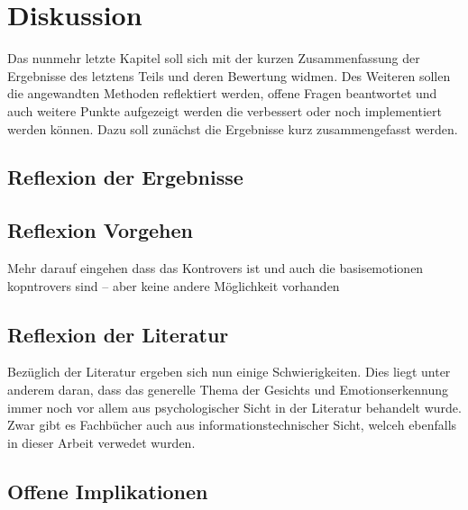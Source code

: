 \documentclass[12pt, a4paper]{scrbook}
\begin{document}
\let\cleardoublepage\relax
\chapter{Diskussion}
Das nunmehr letzte Kapitel soll sich mit der kurzen Zusammenfassung der Ergebnisse des letztens Teils und deren Bewertung widmen. Des Weiteren sollen die angewandten Methoden reflektiert werden, offene Fragen beantwortet und auch weitere Punkte aufgezeigt werden die verbessert oder noch implementiert werden können. Dazu soll zunächst die Ergebnisse kurz zusammengefasst werden.
\section{Reflexion der Ergebnisse}
\section{Reflexion Vorgehen}
Mehr darauf eingehen dass das Kontrovers ist und auch die basisemotionen kopntrovers sind --  aber keine andere Möglichkeit vorhanden 
\section{Reflexion der Literatur}
Bezüglich der Literatur ergeben sich nun einige Schwierigkeiten. Dies liegt unter anderem daran, dass das generelle Thema der Gesichts und Emotionserkennung immer noch vor allem aus psychologischer Sicht in der Literatur behandelt wurde. Zwar gibt es Fachbücher auch aus informationstechnischer Sicht, welceh ebenfalls in dieser Arbeit verwedet wurden. 
\section{Offene Implikationen}


\let\cleardoublepage\relax
\pagestyle{empty}
\newpage
\pagestyle{empty}
\printbibheading
\printbibliography[type=book,heading=subbibliography,title={Literaturquellen}]
\printbibliography[type=misc,heading=subbibliography,title={Online Quellen}]
\pagestyle{empty}
\newpage
\pagestyle{empty}
\end{document}
